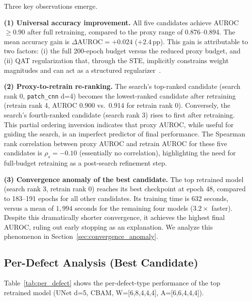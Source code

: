 \documentclass[journal]{IEEEtran}
\begin{document}
\noindent
Three key observations emerge.

\textbf{(1) Universal accuracy improvement.}
All five candidates achieve AUROC $\geq 0.90$ after full retraining, compared
to the proxy range of 0.876--0.894.
The mean accuracy gain is $\Delta\mathrm{AUROC} = +0.024$ ($+2.4$\,pp).
This gain is attributable to two factors: (i) the full 200-epoch budget versus
the reduced proxy budget, and (ii) QAT regularization that, through the STE,
implicitly constrains weight magnitudes and can act as a structured
regularizer~\cite{ding2019regularizing}.

\textbf{(2) Proxy-to-retrain re-ranking.}
The search's top-ranked candidate (search rank 0, \texttt{patch\_cnn} d=4)
becomes the lowest-ranked candidate after retraining (retrain rank 4, AUROC
0.900 vs.\ 0.914 for retrain rank 0).
Conversely, the search's fourth-ranked candidate (search rank 3) rises to
first after retraining.
This partial ordering inversion indicates that proxy AUROC, while useful for
guiding the search, is an imperfect predictor of final performance.
The Spearman rank correlation between proxy AUROC and retrain AUROC for these
five candidates is $\rho_s = -0.10$ (essentially no correlation), highlighting
the need for full-budget retraining as a post-search refinement step.

\textbf{(3) Convergence anomaly of the best candidate.}
The top retrained model (search rank 3, retrain rank 0) reaches its best
checkpoint at epoch 48, compared to 183--191 epochs for all other candidates.
Its training time is 632 seconds, versus a mean of $1{,}994$ seconds for the
remaining four models ($3.2\times$ faster).
Despite this dramatically shorter convergence, it achieves the highest final
AUROC, ruling out early stopping as an explanation.
We analyze this phenomenon in Section~\ref{sec:convergence_anomaly}.

\subsection{Per-Defect Analysis (Best Candidate)}
\label{sec:per_defect}

Table~\ref{tab:per_defect} shows the per-defect-type performance of the top
retrained model (UNet d=5, CBAM, W=[6,8,4,4,4], A=[6,6,4,4,4]).
\end{document}
